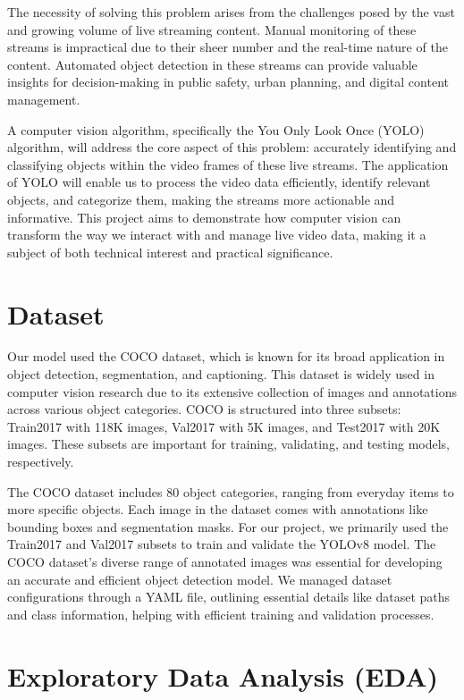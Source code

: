 \documentclass[10pt]{extarticle}
\begin{document}
The necessity of solving this problem arises from the challenges posed by the vast and growing volume of live streaming content. Manual monitoring of these streams is impractical due to their sheer number and the real-time nature of the content. Automated object detection in these streams can provide valuable insights for decision-making in public safety, urban planning, and digital content management.

A computer vision algorithm, specifically the You Only Look Once (YOLO) algorithm, will address the core aspect of this problem: accurately identifying and classifying objects within the video frames of these live streams. The application of YOLO will enable us to process the video data efficiently, identify relevant objects, and categorize them, making the streams more actionable and informative. This project aims to demonstrate how computer vision can transform the way we interact with and manage live video data, making it a subject of both technical interest and practical significance.

\section{Dataset}

Our model used the COCO dataset, which is known for its broad application in object detection, segmentation, and captioning. This dataset is widely used in computer vision research due to its extensive collection of images and annotations across various object categories. COCO is structured into three subsets: Train2017 with 118K images, Val2017 with 5K images, and Test2017 with 20K images. These subsets are important for training, validating, and testing models, respectively.

The COCO dataset includes 80 object categories, ranging from everyday items to more specific objects. Each image in the dataset comes with annotations like bounding boxes and segmentation masks. For our project, we primarily used the Train2017 and Val2017 subsets to train and validate the YOLOv8 model. The COCO dataset's diverse range of annotated images was essential for developing an accurate and efficient object detection model. We managed dataset configurations through a YAML file, outlining essential details like dataset paths and class information, helping with efficient training and validation processes.

\section{Exploratory Data Analysis (EDA)}
\end{document}
